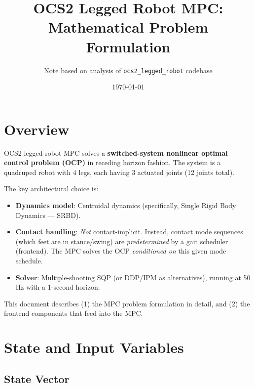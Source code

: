 \documentclass[11pt,a4paper]{article}
\title{OCS2 Legged Robot MPC: \\Mathematical Problem Formulation}
\author{Note based on analysis of \texttt{ocs2\_legged\_robot} codebase}
\date{\today}
\begin{document}
\maketitle
\tableofcontents
\newpage


\section{Overview}

OCS2 legged robot MPC solves a \textbf{switched-system nonlinear optimal control problem (OCP)}
in receding horizon fashion. The system is a quadruped robot with 4 legs, each having 3 actuated joints (12 joints total).

The key architectural choice is:
\begin{itemize}
	\item \textbf{Dynamics model}: Centroidal dynamics (specifically, Single Rigid Body Dynamics --- SRBD).
	\item \textbf{Contact handling}: \emph{Not} contact-implicit. Instead, contact mode sequences (which feet are in stance/swing) are \emph{predetermined} by a gait scheduler (frontend). The MPC solves the OCP \emph{conditioned on} this given mode schedule.
	\item \textbf{Solver}: Multiple-shooting SQP (or DDP/IPM as alternatives), running at 50 Hz with a 1-second horizon.
\end{itemize}

This document describes (1) the MPC problem formulation in detail, and (2) the frontend components that feed into the MPC.


\section{State and Input Variables}

\subsection{State Vector}
\end{document}
